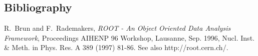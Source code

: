 \documentclass[aps,prl,floatfix,preprint,nofootinbib]{revtex4}
\begin{document}
\clearpage
\begin{thebibliography}{9}
\section{Bibliography}
  R.~Brun and F.~Rademakers, \emph{ROOT - An Object Oriented Data Analysis Framework}, Proceedings AIHENP 96 Workshop, Lausanne, Sep. 1996, Nucl. Inst. \& Meth. in Phys. Res. A 389 (1997) 81-86. See also http://root.cern.ch/.

\end{thebibliography}

\clearpage

\end{document}
